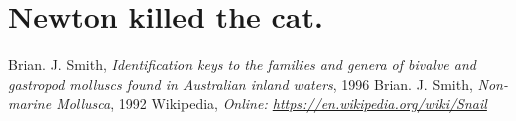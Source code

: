 \documentclass{article}
\begin{document}
\printnoidxglossary[style=listdotted]

\section*{Newton killed the cat.}

\begin{thebibliography}{8}
     Brian. J. Smith, \emph{Identification keys to the families and genera of bivalve and gastropod molluscs found in Australian inland waters}, 1996
     Brian. J. Smith, \emph{Non-marine Mollusca}, 1992
     Wikipedia, \emph{Online: \url{https://en.wikipedia.org/wiki/Snail}}

\end{thebibliography}
\end{document}
